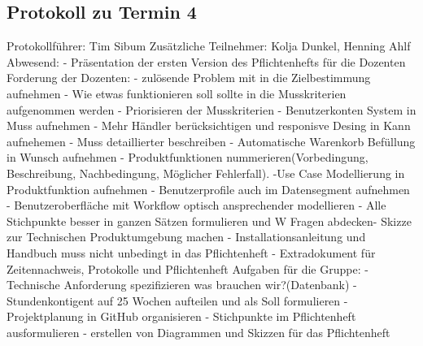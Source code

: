  \subsection{Protokoll zu Termin 4}
 Protokollführer: Tim Sibum \newline
Zusätzliche Teilnehmer: Kolja Dunkel, Henning Ahlf \newline
Abwesend: - \newline \newline
Präsentation der ersten Version des Pflichtenhefts für die Dozenten \newline\newline
Forderung der Dozenten:\newline
  - zulösende Problem mit in die Zielbestimmung aufnehmen\newline
  - Wie etwas funktionieren soll sollte in die Musskriterien aufgenommen werden
  \newline 
  - Priorisieren der Musskriterien\newline
  - Benutzerkonten System in Muss aufnehmen\newline
  - Mehr Händler berücksichtigen und responisve Desing in Kann aufnehemen\newline
  - Muss detaillierter beschreiben\newline
  - Automatische Warenkorb Befüllung in Wunsch aufnehmen\newline
  - Produktfunktionen nummerieren(Vorbedingung, Beschreibung\newline, 
  Nachbedingung, Möglicher Fehlerfall).\newline
  -Use Case Modellierung in Produktfunktion aufnehmen\newline
  - Benutzerprofile auch im Datensegment aufnehmen\newline
  - Benutzeroberfläche mit Workflow optisch ansprechender modellieren\newline
  - Alle Stichpunkte besser in ganzen Sätzen formulieren und W Fragen abdecken\newline 	  - Skizze zur Technischen Produktumgebung machen\newline
  - Installationsanleitung und Handbuch muss nicht unbedingt in das Pflichtenheft\newline 
  - Extradokument für Zeitennachweis, Protokolle und Pflichtenheft \newline 
Aufgaben für die Gruppe:\newline
  - Technische Anforderung spezifizieren was brauchen wir?(Datenbank)\newline        
  - Stundenkontigent auf 25 Wochen aufteilen und als Soll formulieren \newline
  - Projektplanung in GitHub organisieren\newline
  - Stichpunkte im Pflichtenheft ausformulieren \newline
  - erstellen von Diagrammen und Skizzen für das Pflichtenheft \newline

